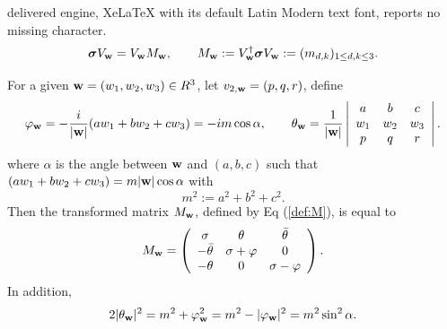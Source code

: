 \documentclass[10pt,a4paper]{amsart}
\newcommand{\bS}{\boldsymbol{\sigma}}
\newcommand{\bw}{{\bf w}}
\renewcommand{\phi}{\varphi}
\begin{document}
delivered engine, XeLaTeX with its default Latin Modern text font, reports no missing character.
\begin{equation}\label{def:M}
\bS V_{\bw} = V_{\bw} M_{\bw},  \qquad  M_{\bw} :=  V_{\bw}^{\dagger} \bS V_{\bw} :=(m_{d,k})_{1\le d,k\le 3}.
\end{equation}

\begin{lem} For a given $\bw=(w_1,w_2,w_3)\in R^3$, let $v_{2,\bw} = (p,q,r)$, define
	\begin{equation}\label{def:phi_theta}
		\phi_{\bw} = -\frac{i}{|\bw|}(aw_1+bw_2+cw_3)=-i m \cos\alpha, \qquad \theta_{\bw} = \frac{1}{|\bw|} \left|
		\begin{array}{ccc}
			a & b & c\\
			w_1 & w_2  & w_3 \\
			p & q & r \\
		\end{array}
		\right|.
	\end{equation}
	where $\alpha$ is the angle between $\bw$ and $(a,b,c)$ such that $(aw_1+bw_2+cw_3) = m|\bw|\cos\alpha $ with
	\[
	 m^2:= a^2+b^2+c^2.
	\]
Then the transformed matrix $M_{\bw}$, defined by Eq (\ref{def:M}), is equal to
	\begin{equation}\label{eq:M_w}
		M_{\bw} = \left(
		\begin{array}{ccc}
			\sigma & \theta & \bar\theta\\
			-\bar\theta & \sigma + \phi & 0 \\
			-\theta & 0 & \sigma - \phi \\
		\end{array}
		\right).
	\end{equation}
	In addition,
	\begin{equation}\label{eq:theta_phi}
		2|\theta_{\bw}|^2 = m^2 +  \phi_{\bw}^2 = m^2- |\phi_{\bw}|^2 =m^2 \sin^2\alpha.  
	\end{equation}
\end{lem}
\end{document}
